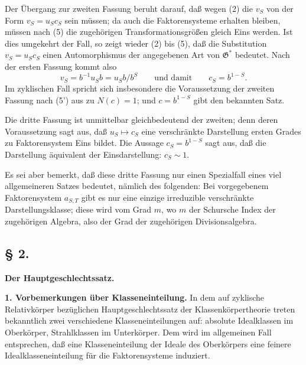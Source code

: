 Der Übergang zur zweiten Fassung beruht darauf, daß wegen (2) die \(v_S\) von der Form \(v_S=u_Sc_S\) sein müssen; da auch die Faktorensysteme erhalten bleiben, müssen nach (5) die zugehörigen Transformationsgrößen gleich Eins werden. Ist dies umgekehrt der Fall, so zeigt wieder (2) bis (5), daß die Substitution \(v_S=u_Sc_S\) einen Automorphismus der angegebenen Art von \(\mathfrak G^*\) bedeutet. Nach der ersten Fassung kommt also
\[
v_S=b^{-1}u_Sb=u_Sb/b^S\qquad\text{und damit}\qquad c_S=b^{1-S}.
\]
Im zyklischen Fall spricht sich insbesondere die Voraussetzung der zweiten Fassung nach (5') aus zu \(N(c)=1\); und \(c=b^{1-S}\) gibt den bekannten Satz.

Die dritte Fassung ist unmittelbar gleichbedeutend der zweiten; denn deren Voraussetzung sagt aus, daß \(u_S\mapsto c_S\) eine verschränkte Darstellung ersten Grades zu Faktorensystem Eins bildet. Die Aussage \(c_S=b^{1-S}\) sagt aus, daß die Darstellung äquivalent der Einsdarstellung: \(c_S\sim1\).

Es sei aber bemerkt, daß diese dritte Fassung nur einen Spezialfall eines viel allgemeineren Satzes bedeutet, nämlich des folgenden: Bei vorgegebenem Faktorensystem \(a_{S,T}\) gibt es nur eine einzige irreduzible verschränkte Darstellungsklasse; diese wird vom Grad \(m\), wo \(m\) der Schursche Index der zugehörigen Algebra, also der Grad der zugehörigen Divisionsalgebra.

\subsection*{§ 2.}
\begin{center}
\textbf{Der Hauptgeschlechtssatz.}
\end{center}

\noindent\textbf{1. Vorbemerkungen über Klasseneinteilung.} In dem auf zyklische Relativkörper bezüglichen Hauptgeschlechtssatz der Klassenkörpertheorie treten bekanntlich zwei verschiedene Klasseneinteilungen auf: absolute Idealklassen im Oberkörper, Strahlklassen im Unterkörper. Dem wird im allgemeinen Fall entsprechen, daß eine Klasseneinteilung der Ideale des Oberkörpers eine feinere Idealklasseneinteilung für die Faktorensysteme induziert.

